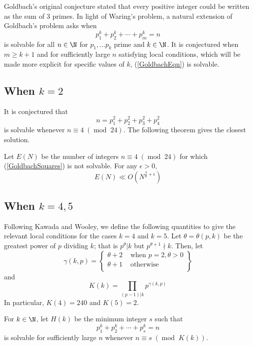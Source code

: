 Goldbach's original conjecture stated that every positive integer could be written as the sum of $3$ primes. In light of Waring's problem, a natural extension of Goldbach's problem asks when
\begin{equation}
    p_1^k+p_2^k+\cdots+p_m^k=n\label{GoldbachEqn}
\end{equation}
is solvable for all $n\in\N$ for $p_1,\dots p_k$ prime and $k\in\N$. It is conjectured when $m\ge k+1$ and for sufficiently large $n$ satisfying local conditions, which will be made more explicit for specific values of $k$, (\ref{GoldbachEqn}) is solvable.

\subsection{When $k=2$}

It is conjectured that
\begin{equation}
n=p_1^2+p_2^2+p_3^2+p_4^2 \label{GoldbachSquares}
\end{equation}
is solvable whenever $n\equiv 4\;(\operatorname{mod}\; 24)$. The following theorem gives the closest solution.

\begin{theorem}
    Let $E(N)$ be the number of integers $n\equiv 4\;(\operatorname{mod}\; 24)$ for which (\ref{GoldbachSquares}) is not solvable. For any $\epsilon>0$,
    $$E(N)\ll O(N^{\frac38+\epsilon})$$
\end{theorem}

\subsection{When $k=4,5$}

Following Kawada and Wooley, we define the following quantities to give the relevant local conditions for the cases $k=4$ and $k=5$. Let $\theta=\theta(p,k)$ be the greatest power of $p$ dividing $k$; that is $p^\theta|k$ but $p^{\theta+1}\nmid k$. Then, let
\[ \gamma(k,p)=\left\{\begin{matrix}
\theta+2 & \text{ when } p=2, \theta>0  \\
\theta+1 & \text{ otherwise}  \\
\end{matrix}\right\}\]
and
$$K(k)=\prod_{(p-1)|k}p^{\gamma(k,p)}$$
In particular, $K(4)=240$ and $K(5)=2$.

\begin{definition}
    For $k\in\N$, let $H(k)$ be the minimum integer $s$ such that
    $$p_1^k+p_2^k+\cdots+p_s^k=n$$
    is solvable for sufficiently large $n$ whenever $n\equiv s\;(\operatorname{mod}\; K(k))$.
\end{definition}

